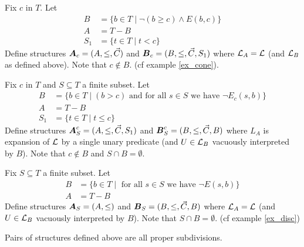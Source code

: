\documentclass{amsart}
\DeclareMathOperator{\A}{\boldface A}
\DeclareMathOperator{\B}{\boldface B}
\begin{document}
\begin{Definition}
	Fix $c$ in $T$. Let
	\begin{align*}
		B &= \{b \in T \mid \neg(b \geq c) \wedge E(b,c)\} \\
		A &= T - B \\
		S_1 &= \{t \in T \mid t < c\}
	\end{align*}
	Define structures $\A_{c} = (A, \leq, \vec C)$ and $\B_{c} = (B, \leq, \vec C, S_1)$ where $\mathcal L_A = \mathcal L$ (and $\mathcal L_B$ as defined above). Note that $c \notin B$. (cf example \ref{ex_cone}).
\end{Definition}

\begin{Definition}
	Fix $c$ in $T$ and $S \subseteq T$ a finite subset. Let
	\begin{align*}
		B &= \{b \in T \mid (b > c) \text{ and for all $s \in S$ we have } \neg E_c(s, b)\} \\
		A &= T - B \\
		S_1 &= \{t \in T \mid t \leq c\}
	\end{align*}
	Define structures $\A^{c}_{S} = (A, \leq, \vec C, S_1)$ and $\B^{c}_{S} = (B, \leq, \vec C, B)$ where $L_A$ is expansion of $\mathcal L$ by a single unary predicate (and $U \in \mathcal L_B$ vacuously interpreted by $B$). Note that $c \notin B$ and $S \cap B = \emptyset$.
\end{Definition}

\begin{Definition}
	Fix $S \subseteq T$ a finite subset. Let
	\begin{align*}
		B &= \{b \in T \mid \text{ for all $s \in S$ we have } \neg E(s, b)\} \\
		A &= T - B
	\end{align*}
	Define structures $\A_{S} = (A, \leq)$ and $\B_{S} = (B, \leq, \vec C, B)$ where $\mathcal L_A = \mathcal L$ (and $U \in \mathcal L_B$ vacuously interpreted by $B$). Note that $S \cap B = \emptyset$. (cf example \ref{ex_disc})
\end{Definition}

\begin{Lemma}
	Pairs of structures defined above are all proper subdivisions.
\end{Lemma}
\end{document}
